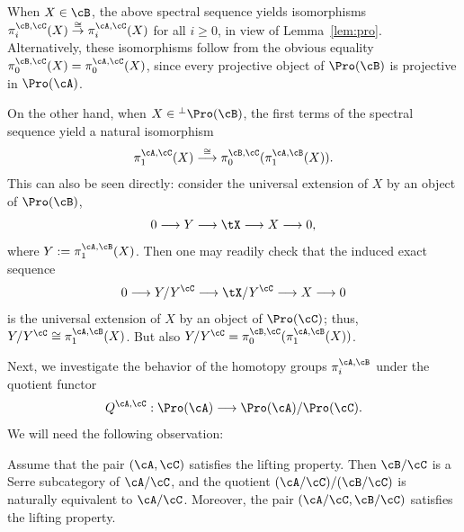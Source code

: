 \begin{rema}\label{rem:comp}
When $X \in \cB$, the above spectral sequence yields isomorphisms $\pi_i^{\cB,\cC}(X) \stackrel{\cong}{\to} \pi_i^{\cA,\cC}(X)$ for all $i \geq 0$, in view of Lemma~\ref{lem:pro}. Alternatively, these isomorphisms follow from the obvious equality $\pi_0^{\cB,\cC}(X) = \pi_0^{\cA,\cC}(X)$, since every projective object of $\Pro(\cB)$ is projective in $\Pro(\cA)$.

On the other hand, when $X \in {^{\perp}\Pro(\cB)}$, the first terms of the spectral sequence yield a natural isomorphism
\[
\pi_1^{\cA,\cC}(X) \stackrel{\cong}{\longrightarrow}
\pi_0^{\cB,\cC}(\pi_1^{\cA,\cB}(X)).
\]
This can also be seen directly: consider the universal extension of $X$ by an object of $\Pro(\cB)$,
\[
0 \longrightarrow Y \longrightarrow \tX
\longrightarrow X \longrightarrow 0,
\]
where $Y := \pi_1^{\cA,\cB}(X)$. Then one may readily check that the induced exact sequence
\[
0 \longrightarrow Y/Y^{\cC}
\longrightarrow \tX/Y^{\cC} \longrightarrow X
\longrightarrow 0
\]
is the universal extension of $X$ by an object of $\Pro(\cC)$; thus, $Y/Y^{\cC} \cong \pi_1^{\cA,\cB}(X)$. But also $Y/Y^{\cC} = \pi_0^{\cB,\cC}(\pi_1^{\cA,\cB}(X))$.
\end{rema}

Next, we investigate the behavior of the homotopy groups $\pi_i^{\cA, \cB}$ under the quotient functor
\[
Q^{\cA,\cC} : \Pro(\cA) \longrightarrow \Pro(\cA)/\Pro(\cC).
\]
We will need the following observation:

\begin{lemm}\label{lem:standard}
Assume that the pair $(\cA,\cC)$ satisfies the lifting property. Then $\cB/\cC$ is a Serre subcategory of $\cA/\cC$, and the quotient $(\cA/\cC)/(\cB /\cC)$ is naturally equivalent to $\cA/\cC$. Moreover, the pair $(\cA/\cC,\cB/\cC)$ satisfies the lifting property.
\end{lemm}

